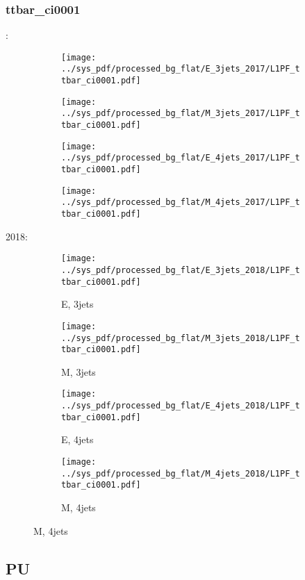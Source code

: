 \documentclass{beamer}
\begin{document}
\begin{frame}
\frametitle{ttbar_ci0001}
\fontsize{5}{1}:
\begin{figure}
\centering
\begin{subfigure}[b]{0.24\textwidth}
\texttt{[image: ../sys\_pdf/processed\_bg\_flat/E\_3jets\_2017/L1PF\_ttbar\_ci0001.pdf]}
\end{subfigure}
\begin{subfigure}[b]{0.24\textwidth}
\texttt{[image: ../sys\_pdf/processed\_bg\_flat/M\_3jets\_2017/L1PF\_ttbar\_ci0001.pdf]}
\end{subfigure}
\begin{subfigure}[b]{0.24\textwidth}
\texttt{[image: ../sys\_pdf/processed\_bg\_flat/E\_4jets\_2017/L1PF\_ttbar\_ci0001.pdf]}
\end{subfigure}
\begin{subfigure}[b]{0.24\textwidth}
\texttt{[image: ../sys\_pdf/processed\_bg\_flat/M\_4jets\_2017/L1PF\_ttbar\_ci0001.pdf]}
\end{subfigure}
\end{figure}
2018:
\begin{figure}
\centering
\begin{subfigure}[b]{0.24\textwidth}
\texttt{[image: ../sys\_pdf/processed\_bg\_flat/E\_3jets\_2018/L1PF\_ttbar\_ci0001.pdf]}
\captionsetup{font=tiny}
\caption{E, 3jets}
\end{subfigure}
\begin{subfigure}[b]{0.24\textwidth}
\texttt{[image: ../sys\_pdf/processed\_bg\_flat/M\_3jets\_2018/L1PF\_ttbar\_ci0001.pdf]}
\captionsetup{font=tiny}
\caption{M, 3jets}
\end{subfigure}
\begin{subfigure}[b]{0.24\textwidth}
\texttt{[image: ../sys\_pdf/processed\_bg\_flat/E\_4jets\_2018/L1PF\_ttbar\_ci0001.pdf]}
\captionsetup{font=tiny}
\caption{E, 4jets}
\end{subfigure}
\begin{subfigure}[b]{0.24\textwidth}
\texttt{[image: ../sys\_pdf/processed\_bg\_flat/M\_4jets\_2018/L1PF\_ttbar\_ci0001.pdf]}
\captionsetup{font=tiny}
\caption{M, 4jets}
\end{subfigure}
\end{figure}
\end{frame}


\subsection{PU}
\end{document}
